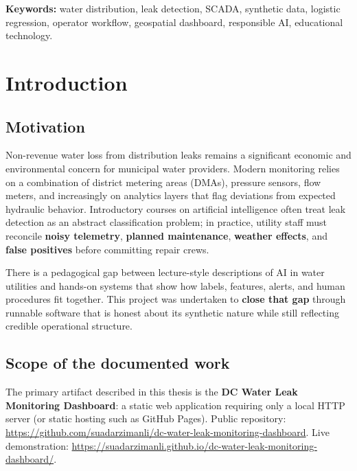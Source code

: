 \documentclass[12pt,a4paper]{article}
\begin{document}
\noindent\textbf{Keywords:} water distribution, leak detection, SCADA, synthetic data, logistic regression, operator workflow, geospatial dashboard, responsible AI, educational technology.

\tableofcontents
\listoffigures
\newpage

\section{Introduction}
\label{sec:intro}

\subsection{Motivation}

Non-revenue water loss from distribution leaks remains a significant economic and environmental concern for municipal water providers. Modern monitoring relies on a combination of district metering areas (DMAs), pressure sensors, flow meters, and increasingly on analytics layers that flag deviations from expected hydraulic behavior. Introductory courses on artificial intelligence often treat leak detection as an abstract classification problem; in practice, utility staff must reconcile \textbf{noisy telemetry}, \textbf{planned maintenance}, \textbf{weather effects}, and \textbf{false positives} before committing repair crews.

There is a pedagogical gap between lecture-style descriptions of AI in water utilities and hands-on systems that show how labels, features, alerts, and human procedures fit together. This project was undertaken to \textbf{close that gap} through runnable software that is honest about its synthetic nature while still reflecting credible operational structure.

\subsection{Scope of the documented work}

The primary artifact described in this thesis is the \textbf{DC Water Leak Monitoring Dashboard}: a static web application requiring only a local HTTP server (or static hosting such as GitHub Pages). Public repository:
\url{https://github.com/suadarzimanli/dc-water-leak-monitoring-dashboard}.
Live demonstration:
\url{https://suadarzimanli.github.io/dc-water-leak-monitoring-dashboard/}.
\end{document}
